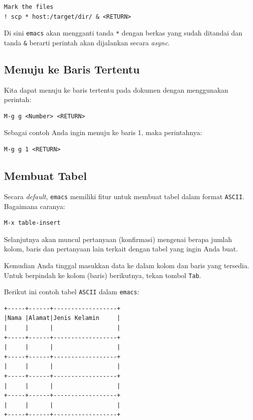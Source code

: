 \documentclass{article}
\begin{document}
\begin{verbatim}
Mark the files
! scp * host:/target/dir/ & <RETURN>
\end{verbatim}

Di sini \verb=emacs= akan mengganti tanda \verb=*= dengan berkas yang sudah
ditandai dan tanda \verb=&= berarti perintah akan dijalankan secara 
\emph{async}.

\subsection{Menuju ke Baris Tertentu}
Kita dapat menuju ke baris tertentu pada dokumen dengan menggunakan perintah:

\begin{verbatim}
M-g g <Number> <RETURN>
\end{verbatim}

Sebagai contoh Anda ingin menuju ke baris 1, maka perintahnya:

\begin{verbatim}
M-g g 1 <RETURN>
\end{verbatim}

\subsection{Membuat Tabel}
Secara \emph{default}, \verb=emacs= memiliki fitur untuk membuat tabel dalam
format \verb=ASCII=. Bagaimana caranya:

\begin{verbatim}
M-x table-insert
\end{verbatim}

Selanjutnya akan muncul pertanyaan (konfirmasi) mengenai berapa jumlah kolom, 
baris dan pertanyaan lain terkait dengan tabel yang ingin Anda buat.

Kemudian Anda tinggal masukkan data ke dalam kolom dan baris yang tersedia.
Untuk berpindah ke kolom (baris) berikutnya, tekan tombol \verb=Tab=.

Berikut ini contoh tabel \verb=ASCII= dalam \verb=emacs=:

\begin{verbatim}
+-----+------+------------------+
|Nama |Alamat|Jenis Kelamin     |
|     |      |                  |
+-----+------+------------------+
|     |      |                  |
+-----+------+------------------+
|     |      |                  |
+-----+------+------------------+
|     |      |                  |
+-----+------+------------------+
|     |      |                  |
+-----+------+------------------+
\end{verbatim}
\end{document}
